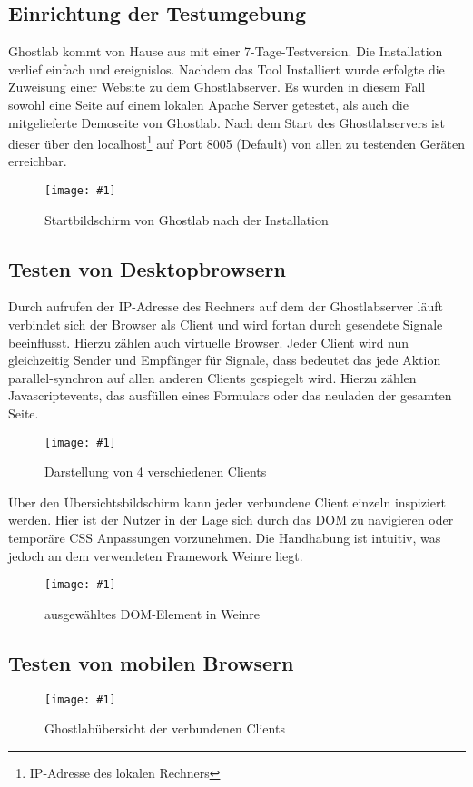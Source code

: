 \documentclass[13pt,a4paper,oneside]{scrbook} %
\newcommand{\mi}[1]{\index{#1}#1}
\renewcommand{\\}{\bigskip}
\newcommand{\ig}[3]{
\begin{figure}[htbp]
	\centering
	\texttt{[image: \#1]}%
	\caption[#2]{#3}%
\end{figure}
}
\begin{document}
		\subsection {Einrichtung der Testumgebung}
		Ghostlab kommt von Hause aus mit einer 7-Tage-Testversion. Die Installation verlief einfach und ereignislos. Nachdem das 		Tool Installiert wurde erfolgte die Zuweisung einer Website zu dem Ghostlabserver. Es wurden in diesem Fall sowohl eine 		Seite auf einem lokalen Apache Server getestet, als auch die mitgelieferte Demoseite von Ghostlab. Nach dem Start des 			Ghostlabservers ist dieser über den localhost\footnote{IP-Adresse des lokalen Rechners} auf Port 8005 (Default) von allen 		zu testenden Geräten erreichbar.
		\ig{../pictures/ghostlab/startbildschirm}{Startbildschirm Ghostlab}{Startbildschirm von Ghostlab nach der Installation}
		
		\subsection{Testen von Desktopbrowsern}
		Durch aufrufen der IP-Adresse des Rechners auf dem der Ghostlabserver läuft verbindet sich der Browser als Client und 			wird fortan durch gesendete Signale beeinflusst. Hierzu zählen auch virtuelle Browser. Jeder Client wird nun gleichzeitig 			Sender und Empfänger für Signale, dass bedeutet das jede Aktion parallel-synchron auf allen anderen Clients gespiegelt 			wird. Hierzu zählen Javascriptevents, das ausfüllen eines Formulars oder das neuladen der gesamten Seite.
		\ig{../pictures/ghostlab/workspaces}{Übersicht Clients}{Darstellung von 4 verschiedenen Clients } 
		
		Über den Übersichtsbildschirm kann jeder verbundene Client einzeln inspiziert werden. Hier ist der Nutzer in der Lage sich 		durch das DOM zu navigieren oder temporäre CSS Anpassungen vorzunehmen. Die Handhabung ist intuitiv, was jedoch an 		dem verwendeten Framework \mi{Weinre} liegt.
		\ig{../pictures/ghostlab/weinre}{Exemplarisch Weinreansicht}{ausgewähltes DOM-Element in Weinre}
		
		\subsection{Testen von mobilen Browsern}
		\ig{../pictures/ghostlab/uebersicht_mobil}{Übersicht mobile Clients Ghostlab}{Ghostlabübersicht der verbundenen Clients}

		
		
		\pagebreak
		
\end{document}

